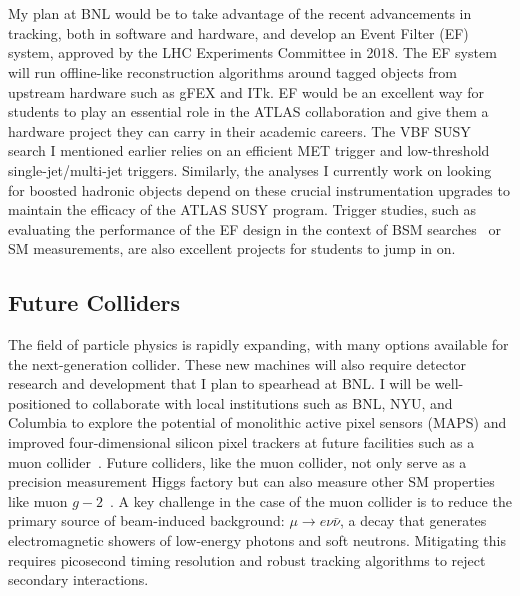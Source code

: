\documentclass[10pt,a4paper,sans]{moderncv} %
\begin{document}
\\
\\
My plan at BNL would be to take advantage of the recent advancements in tracking, both in software and hardware, and develop an Event Filter (EF) system, approved by the LHC Experiments Committee in 2018. The EF system will run offline-like reconstruction algorithms around tagged objects from upstream hardware such as gFEX and ITk. EF would be an excellent way for students to play an essential role in the ATLAS collaboration and give them a hardware project they can carry in their academic careers. The VBF SUSY search I mentioned earlier relies on an efficient MET trigger and low-threshold single-jet/multi-jet triggers. Similarly, the analyses I currently work on looking for boosted hadronic objects depend on these crucial instrumentation upgrades to maintain the efficacy of the ATLAS SUSY program. Trigger studies, such as evaluating the performance of the EF design in the context of BSM searches~\cite{Bose:2022obr} or SM measurements, are also excellent projects for students to jump in on.

\subsection{Future Colliders}
The field of particle physics is rapidly expanding, with many options available for the next-generation collider. These new machines will also require detector research and development that I plan to spearhead at BNL. I will be well-positioned to collaborate with local institutions such as BNL, NYU, and Columbia to explore the potential of monolithic active pixel sensors (MAPS) and improved four-dimensional silicon pixel trackers at future facilities such as a muon collider~\cite{Black:2022cth}. Future colliders, like the muon collider, not only serve as a precision measurement Higgs factory but can also measure other SM properties like muon $g-2$~\cite{Chakraborti:2021dli}. A key challenge in the case of the muon collider is to reduce the primary source of beam-induced background: $\mu \to e \nu \bar{\nu}$, a decay that generates electromagnetic showers of low-energy photons and soft neutrons. Mitigating this requires picosecond timing resolution and robust tracking algorithms to reject secondary interactions.
\end{document}
